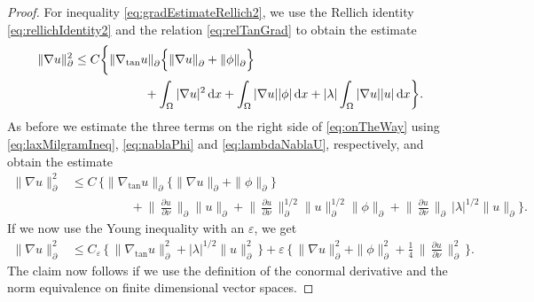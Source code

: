\begin{proof}
  For inequality \eqref{eq:gradEstimateRellich2}, we use the Rellich identity \eqref{eq:rellichIdentity2} and the relation \eqref{eq:relTanGrad} to obtain the estimate
  \begin{align}
    \label{eq:onTheWay}
    \begin{alignedat}{1}
    \| \nabla u\|_\partial^2 
    &\leq C \bigg\{ \|\nabla_{\mathrm{tan}} u\|^{}_\partial 
    \Big\{ \|\nabla u\|^{}_\partial + \|\phi\|^{}_\partial \Big\}   \\
    &\hspace{2cm} + \int_\Omega |\nabla u|^2 \, {\operatorname{d}\!{x}} + \int_\Omega |\nabla u| |\phi| \, {\operatorname{d}\!{x}} + |\lambda| \int_\Omega |\nabla u| |u|\, {\operatorname{d}\!{x}} \bigg\}.
  \end{alignedat}
  \end{align}
  As before we estimate the three terms on the right side of \eqref{eq:onTheWay} using \eqref{eq:laxMilgramIneq}, \eqref{eq:nablaPhi} and \eqref{eq:lambdaNablaU}, respectively, and obtain the estimate
  \begin{align*}
    \| \nabla u\|_\partial^2 
    &\leq C\, \bigg\{ \|\nabla_{\mathrm{tan}} u\|^{}_\partial 
    \Big\{ \|\nabla u\|^{}_\partial + \|\phi\|^{}_\partial \Big\}   \\
    &\hspace{2cm} + \Big\|\, \frac{\partial u}{\partial \nu} \, \Big\|^{}_\partial \| u\|^{}_\partial
+ \Big\|\, \frac{\partial u}{\partial \nu} \, \Big\|_\partial^{1/2} \|u\|_\partial^{1/2} \|\phi\|^{}_\partial + \Big\|\, \frac{\partial u}{\partial \nu} \,\Big\|^{}_\partial \, |\lambda|^{1/2} \big\| u  \big\|^{}_\partial \bigg\}.
  \end{align*}
  If we now use the Young inequality with an $\varepsilon$, we get
  \begin{align*}
    \|\nabla u\|_\partial^2 
    &\leq C_\varepsilon\, \Big\{ \, \|\nabla_{\mathrm{tan}} u\|_\partial^2 + |\lambda|^{1/2} \| u\|_\partial^2 \, \Big\}  + \varepsilon\, \bigg\{ \, \|\nabla u\|_\partial^2 + \|\phi\|_\partial^2 + \frac{1}{4}\,\Big\|\,\frac{\partial u}{\partial \nu} \, \Big\|_\partial^2 \, \bigg\}.
  \end{align*}
  The claim now follows if we use the definition of the conormal derivative and the norm equivalence on finite dimensional vector spaces.
\end{proof}

